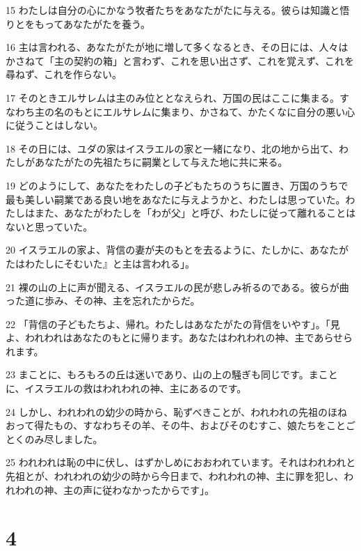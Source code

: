 \par 15 わたしは自分の心にかなう牧者たちをあなたがたに与える。彼らは知識と悟りとをもってあなたがたを養う。
\par 16 主は言われる、あなたがたが地に増して多くなるとき、その日には、人々はかさねて「主の契約の箱」と言わず、これを思い出さず、これを覚えず、これを尋ねず、これを作らない。
\par 17 そのときエルサレムは主のみ位ととなえられ、万国の民はここに集まる。すなわち主の名のもとにエルサレムに集まり、かさねて、かたくなに自分の悪い心に従うことはしない。
\par 18 その日には、ユダの家はイスラエルの家と一緒になり、北の地から出て、わたしがあなたがたの先祖たちに嗣業として与えた地に共に来る。
\par 19 どのようにして、あなたをわたしの子どもたちのうちに置き、万国のうちで最も美しい嗣業である良い地をあなたに与えようかと、わたしは思っていた。わたしはまた、あなたがわたしを「わが父」と呼び、わたしに従って離れることはないと思っていた。
\par 20 イスラエルの家よ、背信の妻が夫のもとを去るように、たしかに、あなたがたはわたしにそむいた』と主は言われる」。
\par 21 裸の山の上に声が聞える、イスラエルの民が悲しみ祈るのである。彼らが曲った道に歩み、その神、主を忘れたからだ。
\par 22 「背信の子どもたちよ、帰れ。わたしはあなたがたの背信をいやす」。「見よ、われわれはあなたのもとに帰ります。あなたはわれわれの神、主であらせられます。
\par 23 まことに、もろもろの丘は迷いであり、山の上の騒ぎも同じです。まことに、イスラエルの救はわれわれの神、主にあるのです。
\par 24 しかし、われわれの幼少の時から、恥ずべきことが、われわれの先祖のほねおって得たもの、すなわちその羊、その牛、およびそのむすこ、娘たちをことごとくのみ尽しました。
\par 25 われわれは恥の中に伏し、はずかしめにおおわれています。それはわれわれと先祖とが、われわれの幼少の時から今日まで、われわれの神、主に罪を犯し、われわれの神、主の声に従わなかったからです」。

\chapter{4}

